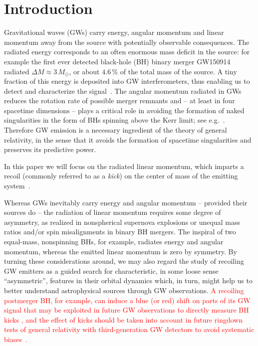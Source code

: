 \documentclass[floats,floatfix,showpacs,amssymb,prd,twocolumn,superscriptaddress,nofootinbib,nolongbibliography,reprint]{revtex4-2}
\newcounter{count}
\newcommand{\mr}[1]{{\textcolor{cyan}{\sf{[MR: #1]}} }}
\newcommand{\eb}[1]{{\textcolor{blue}{\sf{[EB: #1]}} }}
\newcommand{\rc}[1]{{\textcolor{forestgreen}{\sf{[RC: #1]}} }}
\newcommand{\new}[1]{{\textcolor{red}{ #1} }}
\begin{document}
\section{Introduction}

Gravitational waves (GWs) carry energy, angular momentum and linear
momentum away from the source with potentially observable
consequences. The radiated energy corresponds to an often enormous
mass deficit in the source: for example the first ever detected
black-hole (BH) binary merger GW150914~\cite{Abbott:2016blz} radiated
$\Delta M\approx 3\,M_{\odot}$, or about $4.6\,\%$ of the total mass
of the source. A tiny fraction of this energy is deposited into GW
interferometers, thus enabling us to detect and characterize the
signal~\cite{Saulson:2010zz}. The angular momentum radiated in GWs
reduces the rotation rate of possible merger remnants and -- at least
in four spacetime dimensions -- plays a critical role in avoiding the
formation of naked singularities in the form of BHs spinning above the
Kerr limit; see
e.g.~\cite{Campanelli:2006uy,Sperhake:2009jz}. Therefore GW emission
is a necessary ingredient of the theory of general relativity, in the
sense that it avoids the formation of spacetime singularities and
preserves its predictive power.

In this paper we will focus on the radiated linear momentum, which
imparts a recoil (commonly referred to as a \emph{kick}) on the center
of mass of the emitting
system~\cite{Bonnor1961-wy,Peres:1962zz,Bekenstein:1973zz}.

Whereas GWs inevitably carry energy and angular momentum -- provided
their sources do -- the radiation of linear momentum requires some
degree of asymmetry, as realized in nonspherical supernova explosions
or unequal mass ratios and/or spin misalignments in binary BH
mergers. The inspiral of two equal-mass, nonspinning BHs, for example,
radiates energy and angular momentum, whereas the emitted linear
momentum is zero by symmetry. By turning these considerations around,
we may also regard the study of recoiling GW emitters as a guided
search for characteristic, in some loose sense ``asymmetric'',
features in their orbital dynamics which, in turn, might help us to
better understand astrophysical sources through GW observations.
\new{A recoiling postmerger BH, for example, can induce a blue (or
  red) shift on parts of its GW signal that may be exploited in future
  GW observations to directly measure BH kicks
  \cite{Gerosa:2016vip,CalderonBustillo:2018zuq,Lousto:2019lyf}, and
  the effect of kicks should be taken into account in future ringdown
  tests of general relativity with third-generation GW detectors to
  avoid systematic biases~\cite{Varma:2020nbm}.}
\end{document}
